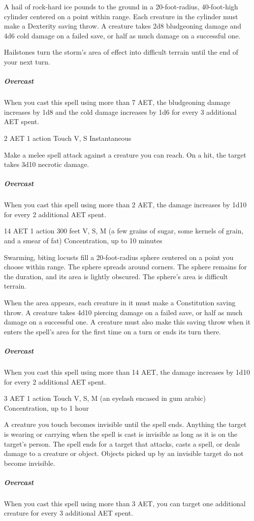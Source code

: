 A hail of rock-hard ice pounds to the ground in a 20-foot-radius, 40-foot-high cylinder centered on a point within range. Each creature in the cylinder must make a Dexterity saving throw. A creature takes 2d8 bludgeoning damage and 4d6 cold damage on a failed save, or half as much damage on a successful one.

Hailstones turn the storm's area of effect into difficult terrain until the end of your next turn.
\subparagraph*{Overcast} When you cast this spell using more than 7 AET, the bludgeoning damage increases by 1d8 and the cold damage increases by 1d6 for every 3 additional AET spent.

\label{spell:inflict-wounds}
{2 AET}
{1 action}
{Touch}
{V, S}
{Instantaneous}

Make a melee spell attack against a creature you can reach. On a hit, the target takes 3d10 necrotic damage.
\subparagraph*{Overcast} When you cast this spell using more than 2 AET, the damage increases by 1d10 for every 2 additional AET spent.

\label{spell:insect-plague}
{14 AET}
{1 action}
{300 feet}
{V, S, M (a few grains of sugar, some kernels of grain, and a smear of fat)}
{Concentration, up to 10 minutes}

Swarming, biting locusts fill a 20-foot-radius sphere centered on a point you choose within range. The sphere spreads around corners. The sphere remains for the duration, and its area is lightly obscured. The sphere's area is difficult terrain.

When the area appears, each creature in it must make a Constitution saving throw. A creature takes 4d10 piercing damage on a failed save, or half as much damage on a successful one. A creature must also make this saving throw when it enters the spell's area for the first time on a turn or ends its turn there.
\subparagraph*{Overcast} When you cast this spell using more than 14 AET, the damage increases by 1d10 for every 2 additional AET spent.

\label{spell:invisibility}
{3 AET}
{1 action}
{Touch}
{V, S, M (an eyelash encased in gum arabic)}
{Concentration, up to 1 hour}

A creature you touch becomes invisible until the spell ends. Anything the target is wearing or carrying when the spell is cast is invisible as long as it is on the target's person. The spell ends for a target that attacks, casts a spell, or deals damage to a creature or object. Objects picked up by an invisible target do not become invisible.
\subparagraph*{Overcast} When you cast this spell using more than 3 AET, you can target one additional creature for every 3 additional AET spent.

